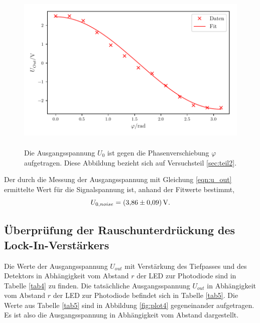 \begin{figure}
    \centering
    \includegraphics[width=12cm, height=8cm]{build/plot3.pdf}
    \caption{Die Ausgangsspannung $U_{0}$ ist gegen die Phasenverschiebung $\varphi$ aufgetragen.
    Diese Abbildung bezieht sich auf Versuchsteil \ref{sec:teil2}.}
    \label{fig:plot3}
\end{figure}

\noindent Der durch die Messung der Ausgangsspannung mit Gleichung \eqref{eqn:u_out} ermittelte Wert für die Signalspannung ist, anhand der Fitwerte bestimmt,
\begin{equation*}
    U_{0,noise} = \SI{3.86 \pm 0.09}{\volt}.
\end{equation*}

\subsection{Überprüfung der Rauschunterdrückung des Lock-In-Verstärkers}
Die Werte der Ausgangsspannung $U_{out}$ mit Verstärkung des Tiefpasses und des Detektors in Abhängigkeit vom Abstand $r$ der LED
zur Photodiode sind in Tabelle \ref{tab4} zu finden.
Die tatsächliche Ausgangsspannung $U_{out}$ in Abhängigkeit vom Abstand $r$ der LED
zur Photodiode befindet sich in Tabelle \ref{tab5}.
Die Werte aus Tabelle \ref{tab5} sind in Abbildung \ref{fig:plot4}
gegeneinander aufgetragen. Es ist also die Ausgangsspannung in Abhängigkeit
vom Abstand dargestellt.



